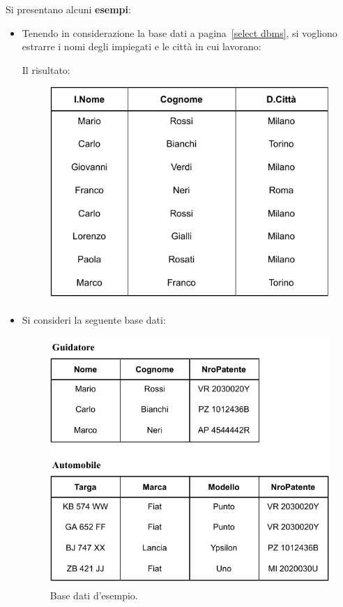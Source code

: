 \documentclass[a4paper]{article}
\begin{document}
	\noindent
	Si presentano alcuni \textcolor{Green4}{\textbf{esempi}}:
	\begin{itemize}
		\item Tenendo in considerazione la base dati a pagina~\ref{select dbms}, si vogliono estrarre i nomi degli impiegati e le città in cui lavorano:
		
		Il risultato:
		\begin{figure}[!htp]
			\centering
			\includegraphics[width=.55\textwidth]{img/join-ex1.pdf}
		\end{figure}\newpage
	
		\item Si consideri la seguente base dati:
		\begin{figure}[!htp]
			\centering
			\includegraphics[width=.75\textwidth]{img/join-ex_dbms.pdf}
			\caption{Base dati d'esempio.}
		\end{figure}
		

\end{itemize}
\end{document}
